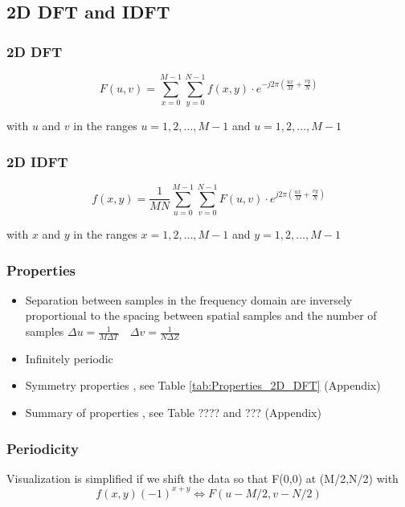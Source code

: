   

\subsection{2D DFT and IDFT }

\subsubsection{2D DFT}
\begin{equation}
    F(u,v) = \sum_{x=0}^{M-1}\sum_{y=0}^{N-1}f(x,y)\cdot e^{-j2\pi \left(\frac{ux}{M}+ \frac{vy}{N}\right)}
\end{equation}
\begin{center}
  with $u$ and $v$ in the ranges $u = 1,2,\ldots,M-1$ and $u = 1,2,\ldots,M-1$
\end{center}
\subsubsection{2D IDFT}
\begin{equation}
    f(x,y) = \frac{1}{MN} \sum_{u=0}^{M-1}\sum_{v=0}^{N-1}F(u,v)\cdot e^{j2\pi \left(\frac{ux}{M}+ \frac{vy}{N}\right)}
\end{equation}
\begin{center}
  with $x$ and $y$ in the ranges $x = 1,2,\ldots,M-1$ and $y = 1,2,\ldots,M-1$
\end{center}

\subsubsection{Properties}
\begin{itemize}
\item Separation between samples in the frequency domain are inversely proportional to the spacing between spatial samples and the number of samples
$\Delta u = \frac{1}{M \Delta T} \quad \Delta v = \frac{1}{N \Delta Z}$
\item Infinitely periodic
\item Symmetry properties , see Table \ref{tab:Properties_2D_DFT} (Appendix)
\item Summary of properties , see Table ???? and ??? (Appendix)

\end{itemize}

\subsubsection{Periodicity }
  Visualization is simplified if we shift the data so that F(0,0) at (M/2,N/2) with
    \begin{equation}
      f(x,y)(-1)^{x+y} \Leftrightarrow F(u-M/2, v-N/2)
    \end{equation}
    
